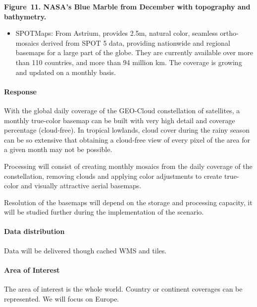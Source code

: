 \documentclass[a4paper]{article}
\newcommand\liststyleLFOxvi{%
\renewcommand\labelitemi{[F0B7?]}
\renewcommand\labelitemii{o}
\renewcommand\labelitemiii{[F0A7?]}
\renewcommand\labelitemiv{[F0B7?]}
}
\begin{document}
{\centering\bfseries
Figure\ 11. NASA{\textquoteright}s Blue Marble from December with
topography and bathymetry.
\par}

\liststyleLFOxvi
\begin{itemize}
\item SPOTMaps: From Astrium, provides 2.5m, natural color, seamless
ortho-mosaics derived from SPOT 5 data, providing nationwide and
regional basemaps for a large part of the globe. They are currently
available over more than 110 countries, and more than 94 million
km{\texttwosuperior}. The coverage is growing and updated on a monthly
basis.
\end{itemize}
\paragraph[Response]{ Response}
With the global daily coverage of the GEO-Cloud constellation of
satellites, a monthly true-color basemap can be built with very high
detail and coverage percentage (cloud-free). In tropical lowlands,
cloud cover during the rainy season can be so extensive that obtaining
a cloud-free view of every pixel of the area for a given month may not
be possible.


\bigskip

Processing will consist of creating monthly mosaics from the daily
coverage of the constellation, removing clouds and applying color
adjustments to create true-color and visually attractive aerial
basemaps.


\bigskip

Resolution of the basemaps will depend on the storage and processing
capacity, it will be studied further during the implementation of the
scenario.

\paragraph[Data distribution]{ Data
distribution}
{
Data will be delivered though cached WMS and tiles.}

\paragraph[Area of Interest\ ]{ Area of
Interest\ }
{
The area of interest is the whole world. Country or continent coverages
can be represented. We will focus on Europe.}
\end{document}
